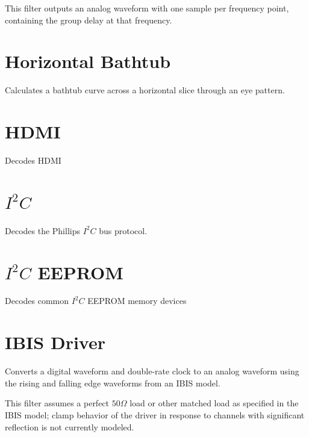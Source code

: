 This filter outputs an analog waveform with one sample per frequency point, containing the group delay at that
frequency.

\pagebreak
\section{Horizontal Bathtub}

Calculates a bathtub curve across a horizontal slice through an eye pattern.

\pagebreak
\section{HDMI}
\label{filter:hdmi}

Decodes HDMI

\pagebreak
\section{$I^2C$}

Decodes the Phillips $I^2C$ bus protocol.

\pagebreak
\section{$I^2C$ EEPROM}

Decodes common $I^2C$ EEPROM memory devices

\pagebreak
\section{IBIS Driver}

Converts a digital waveform and double-rate clock to an analog waveform using the rising and falling edge waveforms
from an IBIS model.

This filter assumes a perfect $50\Omega$ load or other matched load as specified in the IBIS model; clamp behavior of
the driver in response to channels with significant reflection is not currently modeled.

